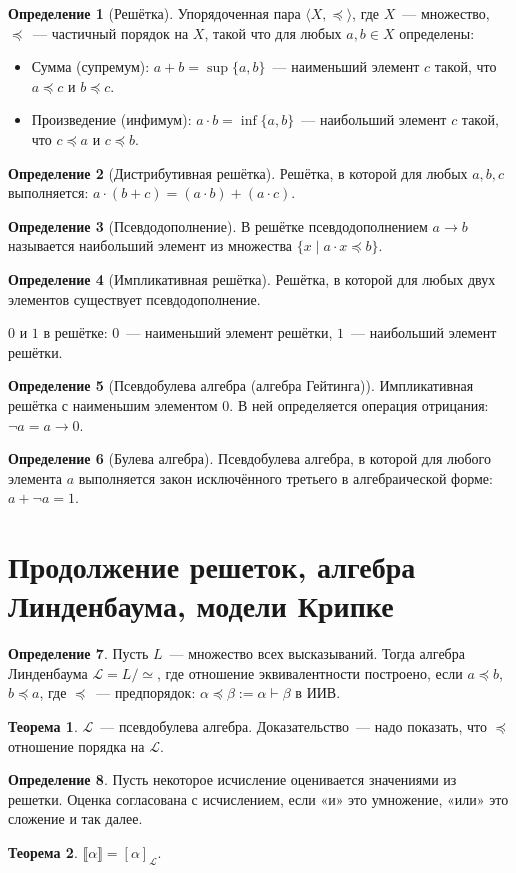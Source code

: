 \documentclass[a4paper,11pt]{article}
\theoremstyle{definition}
\newtheorem*{thm}{Теорема}
\newtheorem*{dfn}{Определение}
\newcommand{\proves}{\vdash}
\begin{document}
\begin{dfn}[Решётка]
Упорядоченная пара $\langle X, \preceq\rangle$, где $X$~--- множество, $\preceq$~---
частичный порядок на $X$, такой что для любых $a, b \in X$ определены:
\begin{itemize}
\item Сумма (супремум): $a + b = \sup\{a, b\}$~--- наименьший элемент $c$ такой,
  что $a \preceq c$ и $b \preceq c$.
\item Произведение (инфимум): $a \cdot b = \inf\{a, b\}$~--- наибольший элемент
  $c$ такой, что $c \preceq a$ и $c \preceq b$.
\end{itemize}
\end{dfn}
\begin{dfn}[Дистрибутивная решётка]
Решётка, в которой для любых $a, b, c$ выполняется: $a \cdot (b + c) = (a \cdot
b) + (a \cdot c)$.
\end{dfn}
\begin{dfn}[Псевдодополнение]
В решётке псевдодополнением $a \to b$ называется наибольший элемент из множества
$\{x \mid a \cdot x \preceq b\}$.
\end{dfn}
\begin{dfn}[Импликативная решётка]
Решётка, в которой для любых двух элементов существует псевдодополнение.
\end{dfn}
$0$ и $1$ в решётке: $0$~--- наименьший элемент решётки, $1$~--- наибольший
элемент решётки.
\begin{dfn}[Псевдобулева алгебра (алгебра Гейтинга)]
Импликативная решётка с наименьшим элементом $0$. В ней определяется операция
отрицания: $\neg a = a \to 0$.
\end{dfn}
\begin{dfn}[Булева алгебра]
Псевдобулева алгебра, в которой для любого элемента $a$ выполняется закон
исключённого третьего в алгебраической форме: $a + \neg a = 1$.
\end{dfn}

\section{Продолжение решеток, алгебра Линденбаума, модели Крипке}
\begin{dfn}
Пусть $L$~--- множество всех высказываний. Тогда алгебра Линденбаума $\mathcal{L}
= L/{\simeq}$, где отношение эквивалентности построено, если $a \preceq b$, $b
\preceq a$, где $\preceq$~--- предпорядок: $\alpha \preceq \beta := \alpha
\proves \beta$ в ИИВ.
\end{dfn}
\begin{thm}
$\mathcal{L}$~--- псевдобулева алгебра. Доказательство~--- надо показать, что
$\preceq$ отношение порядка на $\mathcal{L}$.
\end{thm}
\begin{dfn}
Пусть некоторое исчисление оценивается значениями из решетки. Оценка согласована
с исчислением, если «и» это умножение, «или» это сложение и так далее.
\end{dfn}
\begin{thm}
$\llbracket\alpha\rrbracket = [\alpha]_{\mathcal{L}}$.
\end{thm}
\end{document}

